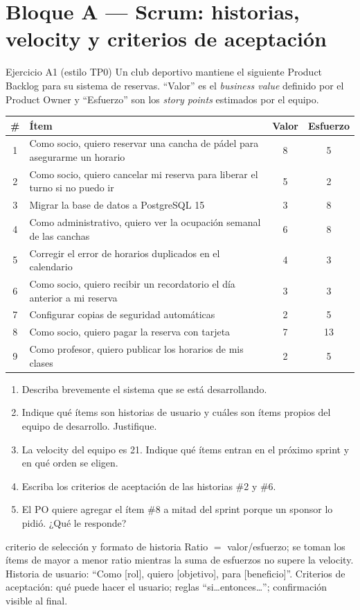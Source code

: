 \documentclass[11pt,a4paper]{article}
\begin{document}
\section{Bloque A --- Scrum: historias, velocity y criterios de aceptación}
\begin{enunciado}{Ejercicio A1 (estilo TP0)}
Un club deportivo mantiene el siguiente Product Backlog para su sistema de reservas. ``Valor'' es el
\emph{business value} definido por el Product Owner y ``Esfuerzo'' son los \emph{story points} estimados por el
equipo.
\begin{center}\small
\begin{tabular}{@{}clcc@{}}
\toprule
\# & Ítem & Valor & Esfuerzo\\
\midrule
1 & Como socio, quiero reservar una cancha de pádel para asegurarme un horario & 8 & 5\\
2 & Como socio, quiero cancelar mi reserva para liberar el turno si no puedo ir & 5 & 2\\
3 & Migrar la base de datos a PostgreSQL 15 & 3 & 8\\
4 & Como administrativo, quiero ver la ocupación semanal de las canchas & 6 & 8\\
5 & Corregir el error de horarios duplicados en el calendario & 4 & 3\\
6 & Como socio, quiero recibir un recordatorio el día anterior a mi reserva & 3 & 3\\
7 & Configurar copias de seguridad automáticas & 2 & 5\\
8 & Como socio, quiero pagar la reserva con tarjeta & 7 & 13\\
9 & Como profesor, quiero publicar los horarios de mis clases & 2 & 5\\
\bottomrule
\end{tabular}
\end{center}
\begin{enumerate}[label=\alph*)]
  \item Describa brevemente el sistema que se está desarrollando.
  \item Indique qué ítems son historias de usuario y cuáles son ítems propios del equipo de desarrollo.
  Justifique.
  \item La velocity del equipo es 21. Indique qué ítems entran en el próximo sprint y en qué orden se eligen.
  \item Escriba los criterios de aceptación de las historias \#2 y \#6.
  \item El PO quiere agregar el ítem \#8 a mitad del sprint porque un sponsor lo pidió. ¿Qué le responde?
\end{enumerate}
\end{enunciado}
\begin{plantilla}{criterio de selección y formato de historia}
Ratio $=$ valor/esfuerzo; se toman los ítems de mayor a menor ratio mientras la suma de esfuerzos no supere la
velocity. Historia de usuario: ``Como [rol], quiero [objetivo], para [beneficio]''. Criterios de aceptación:
qué puede hacer el usuario; reglas ``si\ldots entonces\ldots''; confirmación visible al final.
\end{plantilla}
\end{document}
